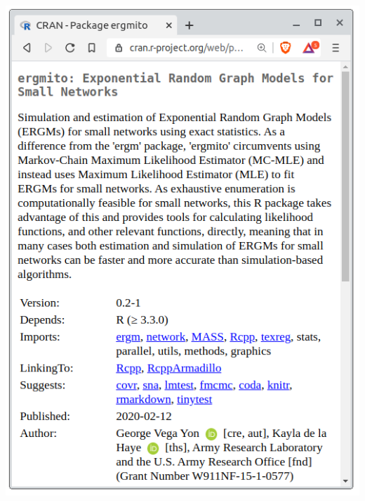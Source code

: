 \documentclass[aspectratio=169, 9pt, handout]{beamer}
\begin{document}
\begin{frame}[c,label=ergmito-checklist]
\begin{minipage}[m]{.28\linewidth}
\end{minipage}
\hfill
\begin{minipage}[m]{.34\linewidth}
	\centering
	\includegraphics[width=.99\linewidth]{ergmito-page-cran.png}
\end{minipage}
\hfill
\begin{minipage}[m]{.34\linewidth}
	\centering

\end{minipage}
\end{frame}
\end{document}
